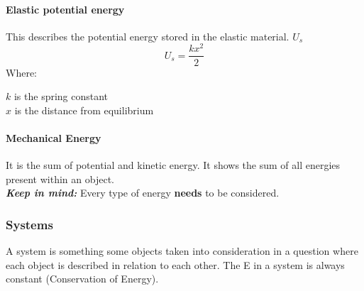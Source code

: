 \documentclass{article} %
\theoremstyle{theorem}
\theoremstyle{definition}
\begin{document}
            \paragraph{Elastic potential energy}
                This describes the potential energy stored in the elastic material. $U_s$
                \begin{equation}
                    U_s=\frac{kx^2}{2}
                \end{equation}
                Where:\begin{center} $k$ is the spring constant\\$x$ is the distance from equilibrium \end{center}
            \paragraph{Mechanical Energy}
            It is the sum of potential and kinetic energy. It shows the sum of all energies present within an object.
            \\\emph{\textbf{Keep in mind:}} Every type of energy \textbf{needs} to be considered.
        \subsubsection{Systems}
            A system is something some objects taken into consideration in a question where each object is described in relation to each other.
            The E in a system is always constant (Conservation of Energy).
\end{document}
